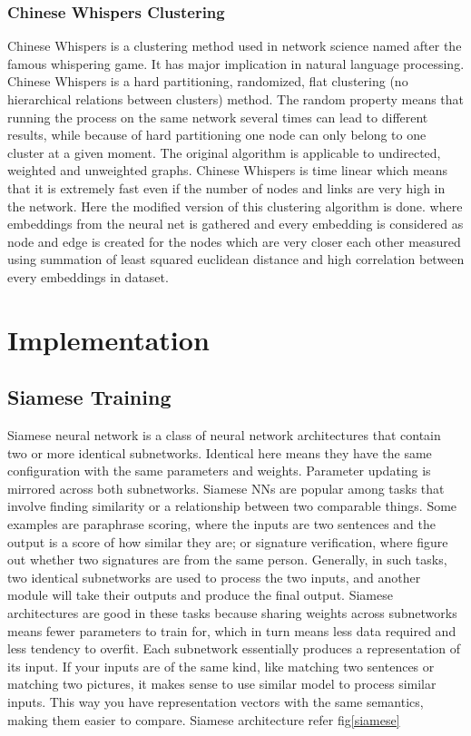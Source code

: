 \documentclass[a4paper,12pt, twoside]{NITKReport}
\begin{document}
\subsection{Chinese Whispers Clustering}
\par Chinese Whispers is a clustering method used in network science named after the famous whispering game. It has major implication in natural language processing. Chinese Whispers is a hard partitioning, randomized, flat clustering (no hierarchical relations between clusters) method. The random property means that running the process on the same network several times can lead to different results, while because of hard partitioning one node can only belong to one cluster at a given moment. The original algorithm is applicable to undirected, weighted and unweighted graphs. Chinese Whispers is time linear which means that it is extremely fast even if the number of nodes and links are very high in the network.\cite{biemann2006chinese} Here the modified version of this clustering algorithm is done. where embeddings from the neural net is gathered and every embedding is considered as node and edge is created for the nodes which are very closer each other measured using summation of least squared euclidean distance and high correlation between every embeddings in dataset.

\newpage
\chapter{Implementation}
\label{chap4}
\section{Siamese Training}
\par Siamese neural network is a class of neural network architectures that contain two or more identical subnetworks. Identical here means they have the same configuration with the same parameters and weights. Parameter updating is mirrored across both subnetworks. Siamese NNs are popular among tasks that involve finding similarity or a relationship between two comparable things. Some examples are paraphrase scoring, where the inputs are two sentences and the output is a score of how similar they are; or signature verification, where figure out whether two signatures are from the same person. Generally, in such tasks, two identical subnetworks are used to process the two inputs, and another module will take their outputs and produce the final output. Siamese architectures are good in these tasks because sharing weights across subnetworks means fewer parameters to train for, which in turn means less data required and less tendency to overfit. Each subnetwork essentially produces a representation of its input. If your inputs are of the same kind, like matching two sentences or matching two pictures, it makes sense to use similar model to process similar inputs. This way you have representation vectors with the same semantics, making them easier to compare. \cite{bromley1993reputation}
Siamese architecture refer fig\ref{siamese}
\end{document}
